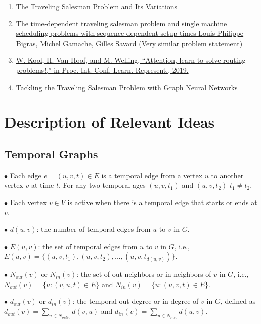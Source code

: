 \begin{enumerate}
    \item \href{https://link.springer.com/book/10.1007/b101971}{The Traveling Salesman Problem and Its Variations}
    \item \href{https://www.sciencedirect.com/science/article/pii/S1572528608000339}{The time-dependent traveling salesman problem and single machine scheduling problems with sequence dependent setup times Louis-Philippe Bigras, Michel Gamache, Gilles Savard} (Very similar problem statement)
    \item \href{https://arxiv.org/abs/1803.08475}{W. Kool, H. Van Hoof, and M. Welling, “Attention, learn to solve routing problems!,” in Proc. Int. Conf. Learn. Represent., 2019.}
    \item \href{https://medium.com/stanford-cs224w/tackling-the-traveling-salesman-problem-with-graph-neural-networks-b86ef4300c6e}{Tackling the Traveling Salesman Problem with Graph Neural Networks}
\end{enumerate}

\section{Description of Relevant Ideas}

\subsection{Temporal Graphs}

$\bullet$ Each edge $e = (u, v, t) \in E$ is a temporal edge from a vertex $u$ to another vertex $v$ at time $t$. For any two temporal ages $(u,v,t_1)$ and $(u,v,t_2)$ $t_1 \neq t_2$.

$\bullet$ Each vertex $v \in V$ is active when there is a temporal edge that starts or ends at $v$.

$\bullet$ $d(u, v)$: the number of temporal edges from $u$ to $v$ in $G$.

$\bullet$ $E(u, v)$: the set of temporal edges from $u$ to $v$ in $G$, i.e., $E(u,v)=\{(u,v,t_1),(u,v,t_2), ..., (u,v,t_{d(u,v)})\}$.

$\bullet$ $N_{out}(v)$ or $N_{in}(v)$: the set of out-neighbors or in-neighbors of $v$ in $G$, i.e., $N_{out}(v) = \{u : (v, u, t) ∈ E\}$ and $N_{in}(v) = \{u : (u, v, t) ∈ E\}$.

$\bullet$ $d_{out}(v)$ or $d_{in}(v)$: the temporal out-degree or in-degree of $v$ in $G$, defined as $d_{out}(v) = \sum_{u \in N_{out(v}} d(v,u)$ and $d_{in}(v) = \sum_{u \in N_{in(v}} d(u,v)$.

